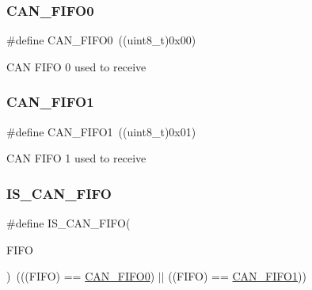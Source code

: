 \subsubsection{\texorpdfstring{CAN\_FIFO0}{CAN\_FIFO0}}
{\footnotesize\ttfamily \#define C\+A\+N\+\_\+\+F\+I\+F\+O0~((uint8\+\_\+t)0x00)}

C\+AN F\+I\+FO 0 used to receive \mbox{\label{group___c_a_n__receive___f_i_f_o__number__constants_gafbcf3f13dbf61030ab7a812595ba9850}} 
\subsubsection{\texorpdfstring{CAN\_FIFO1}{CAN\_FIFO1}}
{\footnotesize\ttfamily \#define C\+A\+N\+\_\+\+F\+I\+F\+O1~((uint8\+\_\+t)0x01)}

C\+AN F\+I\+FO 1 used to receive \mbox{\label{group___c_a_n__receive___f_i_f_o__number__constants_gaeeb94bf58bd48b8928f964eaaa20a24a}} 
\subsubsection{\texorpdfstring{IS\_CAN\_FIFO}{IS\_CAN\_FIFO}}
{\footnotesize\ttfamily \#define I\+S\+\_\+\+C\+A\+N\+\_\+\+F\+I\+FO(\begin{DoxyParamCaption}\item[{}]{F\+I\+FO }\end{DoxyParamCaption})~(((F\+I\+FO) == \mbox{\hyperlink{group___c_a_n__receive___f_i_f_o__number__constants_ga8f52eeefb86b2af5b7c3b4b75fa4d114}{C\+A\+N\+\_\+\+F\+I\+F\+O0}}) $\vert$$\vert$ ((F\+I\+FO) == \mbox{\hyperlink{group___c_a_n__receive___f_i_f_o__number__constants_gafbcf3f13dbf61030ab7a812595ba9850}{C\+A\+N\+\_\+\+F\+I\+F\+O1}}))}


